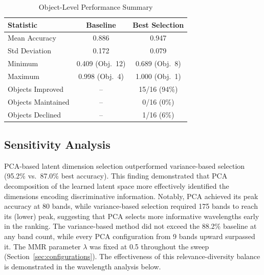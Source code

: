 \begin{table}[!t]
\centering
\caption{Object-Level Performance Summary}
\label{tab:objects}
\begin{tabular}{@{}lcc@{}}
\toprule
\textbf{Statistic} & \textbf{Baseline} & \textbf{Best Selection} \\
\midrule
Mean Accuracy & 0.886 & 0.947 \\
Std Deviation & 0.172 & 0.079 \\
Minimum & 0.409 (Obj.\ 12) & 0.689 (Obj.\ 8) \\
Maximum & 0.998 (Obj.\ 4) & 1.000 (Obj.\ 1) \\
\midrule
Objects Improved & -- & 15/16 (94\%) \\
Objects Maintained & -- & 0/16 (0\%) \\
Objects Declined & -- & 1/16 (6\%) \\
\bottomrule
\end{tabular}
\end{table}


\subsection{Sensitivity Analysis}
\label{sec:results_params}

PCA-based latent dimension selection outperformed variance-based selection (95.2\% vs.\ 87.0\% best accuracy).
This finding demonstrated that PCA decomposition of the learned latent space more effectively identified the dimensions encoding discriminative information.
Notably, PCA achieved its peak accuracy at 80 bands, while variance-based selection required 175 bands to reach its (lower) peak, suggesting that PCA selects more informative wavelengths early in the ranking.
The variance-based method did not exceed the 88.2\% baseline at any band count, while every PCA configuration from 9 bands upward surpassed it.
The MMR parameter $\lambda$ was fixed at 0.5 throughout the sweep (Section~\ref{sec:configurations}).
The effectiveness of this relevance-diversity balance is demonstrated in the wavelength analysis below.

